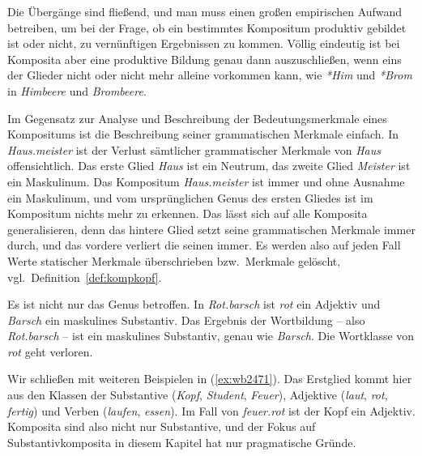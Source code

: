Die Übergänge sind fließend, und man muss einen großen empirischen Aufwand betreiben, um bei der Frage, ob ein bestimmtes Kompositum produktiv gebildet ist oder nicht, zu vernünftigen Ergebnissen zu kommen.
Völlig eindeutig ist bei Komposita aber eine produktive Bildung genau dann auszuschließen, wenn eins der Glieder nicht oder nicht mehr alleine vorkommen kann, wie \textit{*Him} und \textit{*Brom} in \textit{Himbeere} und \textit{Brombeere}.

Im Gegensatz zur Analyse und Beschreibung der Bedeutungsmerkmale eines Kompositums ist die Beschreibung seiner grammatischen Merkmale einfach.
In \textit{Haus.meister} ist \zB der Verlust sämtlicher grammatischer Merkmale von \textit{Haus} offensichtlich.
Das erste Glied \textit{Haus} ist \zB ein Neutrum, das zweite Glied \textit{Meister} ist ein Maskulinum.
Das Kompositum \textit{Haus.meister} ist immer und ohne Ausnahme ein Maskulinum, und vom ursprünglichen Genus des ersten Gliedes ist im Kompositum nichts mehr zu erkennen.
Das lässt sich auf alle Komposita generalisieren, denn das hintere Glied setzt seine grammatischen Merkmale immer durch, und das vordere verliert die seinen immer.
Es werden also auf jeden Fall Werte statischer Merkmale überschrieben bzw.\ Merkmale gelöscht, vgl.\ Definition~\ref{def:kompkopf}.


Es ist nicht nur das Genus betroffen.
In \textit{Rot.barsch} ist \textit{rot} ein Adjektiv und \textit{Barsch} ein maskulines Substantiv.
Das Ergebnis der Wortbildung -- also \textit{Rot.barsch} -- ist ein maskulines Substantiv, genau wie \textit{Barsch}.
Die Wortklasse von \textit{rot} geht verloren.

Wir schließen mit weiteren Beispielen in (\ref{ex:wb2471}).
Das Erstglied kommt hier aus den Klassen der Substantive (\textit{Kopf}, \textit{Student}, \textit{Feuer}), Adjektive (\textit{laut}, \textit{rot}, \textit{fertig}) und Verben (\textit{laufen}, \textit{essen}).
Im Fall von \textit{feuer.rot} ist der Kopf ein Adjektiv.
Komposita sind also nicht nur Substantive, und der Fokus auf Substantivkomposita in diesem Kapitel hat nur pragmatische Gründe.

\begin{exe}
  \ex\label{ex:wb2471}
  \begin{xlist}
  \end{xlist}
\end{exe}

